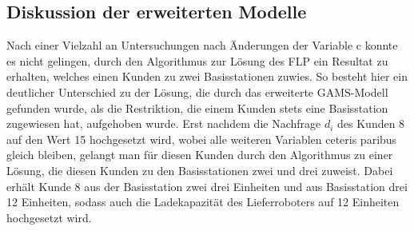 \documentclass[a4paper,12pt,parskip,bibtotoc,liststotoc]{article}
\begin{document}
%
%
%
%
%



\subsection{Diskussion der erweiterten Modelle}

Nach einer Vielzahl an Untersuchungen nach Änderungen der Variable c konnte es nicht gelingen, durch den Algorithmus zur Lösung des FLP ein Resultat zu erhalten, welches einen Kunden zu zwei Basisstationen zuwies.
So besteht hier ein deutlicher Unterschied zu der Lösung, die durch das erweiterte GAMS-Modell gefunden wurde, als die Restriktion, die einem Kunden stets eine Basisstation zugewiesen hat, aufgehoben wurde.
Erst nachdem die Nachfrage $d_{i}$ des Kunden 8 auf den Wert 15 hochgesetzt wird, wobei alle weiteren Variablen ceteris paribus gleich bleiben, gelangt man für diesen Kunden durch den Algorithmus zu einer Lösung, die diesen Kunden zu den Basisstationen zwei und drei zuweist.
Dabei erhält Kunde 8 aus der Basisstation zwei drei Einheiten und aus Basisstation drei 12 Einheiten, sodass auch die Ladekapazität des Lieferroboters auf 12 Einheiten hochgesetzt wird.
\end{document}
